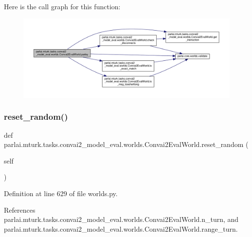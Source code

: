 Here is the call graph for this function\+:
\nopagebreak
\begin{figure}[H]
\begin{center}
\leavevmode
\includegraphics[width=350pt]{classparlai_1_1mturk_1_1tasks_1_1convai2__model__eval_1_1worlds_1_1Convai2EvalWorld_a88eef2bcb0b78f250ba0035df4975652_cgraph}
\end{center}
\end{figure}
\mbox{\label{classparlai_1_1mturk_1_1tasks_1_1convai2__model__eval_1_1worlds_1_1Convai2EvalWorld_a5ddc0b7a6cc22dcfc9da077e70fd7f44}} 
\subsubsection{\texorpdfstring{reset\+\_\+random()}{reset\_random()}}
{\footnotesize\ttfamily def parlai.\+mturk.\+tasks.\+convai2\+\_\+model\+\_\+eval.\+worlds.\+Convai2\+Eval\+World.\+reset\+\_\+random (\begin{DoxyParamCaption}\item[{}]{self }\end{DoxyParamCaption})}



Definition at line 629 of file worlds.\+py.



References parlai.\+mturk.\+tasks.\+convai2\+\_\+model\+\_\+eval.\+worlds.\+Convai2\+Eval\+World.\+n\+\_\+turn, and parlai.\+mturk.\+tasks.\+convai2\+\_\+model\+\_\+eval.\+worlds.\+Convai2\+Eval\+World.\+range\+\_\+turn.

